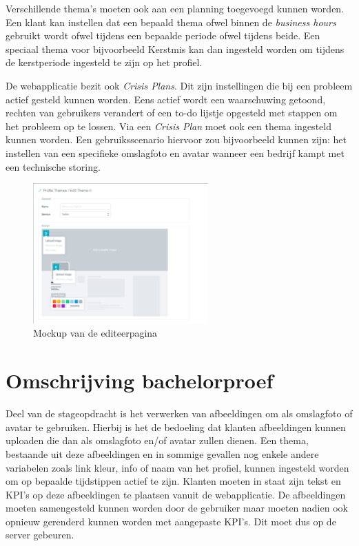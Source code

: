 Verschillende thema's moeten ook aan een planning toegevoegd kunnen worden. Een klant kan instellen dat een bepaald thema ofwel binnen de \textit{business hours} gebruikt wordt ofwel tijdens een bepaalde periode ofwel tijdens beide. Een speciaal thema voor bijvoorbeeld Kerstmis kan dan ingesteld worden om tijdens de kerstperiode ingesteld te zijn op het profiel. 

De webapplicatie bezit ook \textit{Crisis Plans}. Dit zijn instellingen die bij een probleem actief gesteld kunnen worden. Eens actief wordt een waarschuwing getoond, rechten van gebruikers verandert of een to-do lijstje opgesteld met stappen om het probleem op te lossen. Via een \textit{Crisis Plan} moet ook een thema ingesteld kunnen worden. Een gebruiksscenario hiervoor zou bijvoorbeeld kunnen zijn: het instellen van een specifieke omslagfoto en avatar wanneer een bedrijf kampt met een technische storing. 

\begin{figure}[H]
	\centering
	\includegraphics[width=0.6\textwidth]{Figuren/EditThemeMockup.png}
	\caption{Mockup van de editeerpagina \cite{EditThemeMockup}} %
	\label{fig:EditTheme}
\end{figure} 

\chapter{Omschrijving bachelorproef}
\vspace{-3cm}
Deel van de stageopdracht is het verwerken van afbeeldingen om als omslagfoto of avatar te gebruiken. Hierbij is het de bedoeling dat klanten afbeeldingen kunnen uploaden die dan als omslagfoto en/of avatar zullen dienen.  Een thema, bestaande uit deze afbeeldingen en in sommige gevallen nog enkele andere variabelen zoals link kleur, info of naam van het profiel, kunnen ingesteld worden om op bepaalde tijdstippen actief te zijn. Klanten moeten in staat zijn tekst en KPI's op deze afbeeldingen te plaatsen vanuit de webapplicatie. De afbeeldingen moeten samengesteld kunnen worden door de gebruiker maar moeten nadien ook opnieuw gerenderd kunnen worden met aangepaste KPI's. Dit moet dus op de server gebeuren. 

